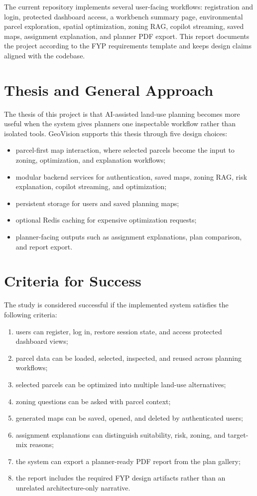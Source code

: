 \documentclass[12pt,a4paper,oneside]{report}
\begin{document}
The current repository implements several user-facing workflows: registration and login, protected dashboard access, a workbench summary page, environmental parcel exploration, spatial optimization, zoning RAG, copilot streaming, saved maps, assignment explanation, and planner PDF export. This report documents the project according to the FYP requirements template and keeps design claims aligned with the codebase.

\section{Thesis and General Approach}
The thesis of this project is that AI-assisted land-use planning becomes more useful when the system gives planners one inspectable workflow rather than isolated tools. GeoVision supports this thesis through five design choices:
\begin{itemize}
  \item parcel-first map interaction, where selected parcels become the input to zoning, optimization, and explanation workflows;
  \item modular backend services for authentication, saved maps, zoning RAG, risk explanation, copilot streaming, and optimization;
  \item persistent storage for users and saved planning maps;
  \item optional Redis caching for expensive optimization requests;
  \item planner-facing outputs such as assignment explanations, plan comparison, and report export.
\end{itemize}

\section{Criteria for Success}
The study is considered successful if the implemented system satisfies the following criteria:
\begin{enumerate}
  \item users can register, log in, restore session state, and access protected dashboard views;
  \item parcel data can be loaded, selected, inspected, and reused across planning workflows;
  \item selected parcels can be optimized into multiple land-use alternatives;
  \item zoning questions can be asked with parcel context;
  \item generated maps can be saved, opened, and deleted by authenticated users;
  \item assignment explanations can distinguish suitability, risk, zoning, and target-mix reasons;
  \item the system can export a planner-ready PDF report from the plan gallery;
  \item the report includes the required FYP design artifacts rather than an unrelated architecture-only narrative.
\end{enumerate}
\end{document}
